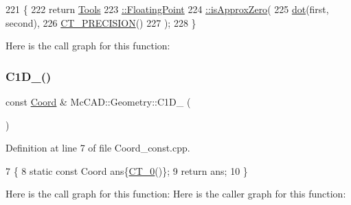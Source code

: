 \begin{DoxyCode}
221                               \{
222     \textcolor{keywordflow}{return} \hyperlink{namespaceMcCAD_1_1Tools_1_1FloatingPoint_a92d14d494cb5fb205e46aad76a9a96b7}{Tools}
223 \hyperlink{namespaceMcCAD_1_1Tools_1_1FloatingPoint_a92d14d494cb5fb205e46aad76a9a96b7}{            ::FloatingPoint}
224 \hyperlink{namespaceMcCAD_1_1Tools_1_1FloatingPoint_a92d14d494cb5fb205e46aad76a9a96b7}{            ::isApproxZero}(
225                 \hyperlink{namespaceMcCAD_1_1Geometry_a3115a59f432b3fc11f4bac6ee17d979b}{dot}(first, second),
226                 \hyperlink{namespaceMcCAD_1_1Geometry_a492f5d9026e8ba8e85f0c81dfb0694ea}{CT\_PRECISION}()
227                 );
228 \}
\end{DoxyCode}
Here is the call graph for this function\+:
\mbox{\label{namespaceMcCAD_1_1Geometry_aef0aab16ba6382b032e4e3a8a5d37b94}} 
\subsubsection{\texorpdfstring{C1\+D\+\_()}{C1D\_0()}}
{\footnotesize\ttfamily const \hyperlink{classMcCAD_1_1Geometry_1_1Coord}{Coord} \& Mc\+C\+A\+D\+::\+Geometry\+::\+C1\+D\+\_ (\begin{DoxyParamCaption}{ }\end{DoxyParamCaption})}



Definition at line 7 of file Coord\+\_\+const.\+cpp.


\begin{DoxyCode}
7                     \{
8     \textcolor{keyword}{static} \textcolor{keyword}{const} Coord ans\{\hyperlink{namespaceMcCAD_1_1Geometry_ac29462a1071e96a3eb0bce1b4097af64}{CT\_0}()\};
9     \textcolor{keywordflow}{return} ans;
10 \}
\end{DoxyCode}
Here is the call graph for this function\+:
Here is the caller graph for this function\+:
\mbox{\label{namespaceMcCAD_1_1Geometry_ad7994c2ae088570476d26d338aa22cff}} 
